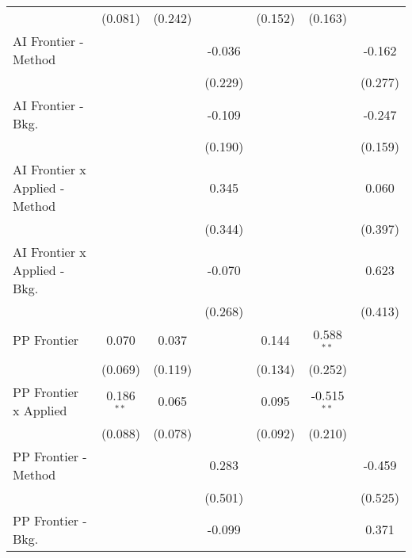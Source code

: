 \begin{tabular}{lcccccc}
                                  & (0.081)        & (0.242)       &             & (0.152)       & (0.163)       &   \\   
   AI Frontier - Method           &                &               & -0.036      &               &               & -0.162\\   
                                  &                &               & (0.229)     &               &               & (0.277)\\   
   AI Frontier - Bkg.             &                &               & -0.109      &               &               & -0.247\\   
                                  &                &               & (0.190)     &               &               & (0.159)\\   
   AI Frontier x Applied - Method &                &               & 0.345       &               &               & 0.060\\   
                                  &                &               & (0.344)     &               &               & (0.397)\\   
   AI Frontier x Applied - Bkg.   &                &               & -0.070      &               &               & 0.623\\   
                                  &                &               & (0.268)     &               &               & (0.413)\\   
   PP Frontier                    & 0.070          & 0.037         &             & 0.144         & 0.588$^{**}$  &   \\   
                                  & (0.069)        & (0.119)       &             & (0.134)       & (0.252)       &   \\   
   PP Frontier x Applied          & 0.186$^{**}$   & 0.065         &             & 0.095         & -0.515$^{**}$ &   \\   
                                  & (0.088)        & (0.078)       &             & (0.092)       & (0.210)       &   \\   
   PP Frontier - Method           &                &               & 0.283       &               &               & -0.459\\   
                                  &                &               & (0.501)     &               &               & (0.525)\\   
   PP Frontier - Bkg.             &                &               & -0.099      &               &               & 0.371\\   

\end{tabular}
